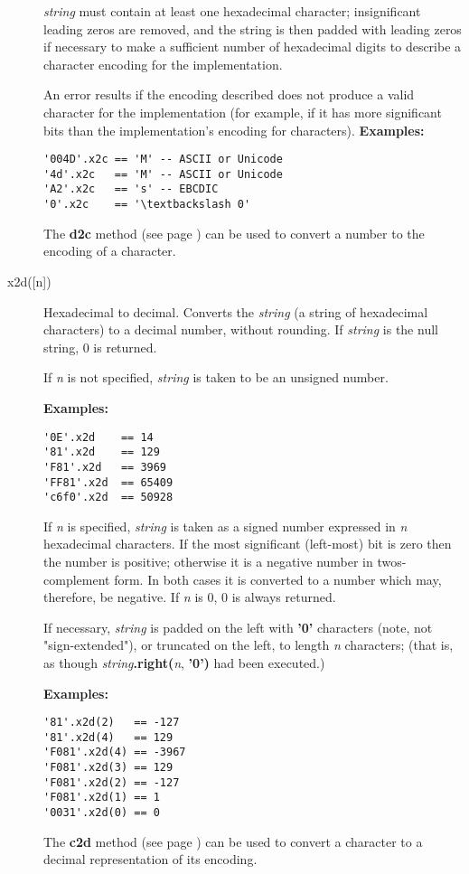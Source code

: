 \begin{description}
\emph{string} must contain at least one hexadecimal character;
insignificant leading zeros are removed, and the string is then padded
with leading zeros if necessary to make a sufficient number of
hexadecimal digits to describe a character encoding for the
implementation.
 
An error results if the encoding described does not produce a valid
character for the implementation (for example, if it has more
significant bits than the implementation's encoding for characters).
 \textbf{Examples:}
\begin{lstlisting}
'004D'.x2c == 'M' -- ASCII or Unicode
'4d'.x2c   == 'M' -- ASCII or Unicode
'A2'.x2c   == 's' -- EBCDIC
'0'.x2c    == '\textbackslash 0'
\end{lstlisting}
 The  \textbf{d2c} method (see page \pageref{refd2c})  can be used to
convert a \nr{} number to the encoding of a character.

\item[x2d([n{]})]\label{refx2d}
Hexadecimal to decimal.
Converts the \emph{string} (a string of hexadecimal characters) to
a decimal number, without rounding.
If \emph{string} is the null string, 0 is returned.
 
If \emph{n} is not specified, \emph{string} is taken to
be an unsigned number.
 
\textbf{Examples:}
\begin{lstlisting}
'0E'.x2d    == 14
'81'.x2d    == 129
'F81'.x2d   == 3969
'FF81'.x2d  == 65409
'c6f0'.x2d  == 50928
\end{lstlisting}
 
If \emph{n} is specified, \emph{string} is taken as a signed
number expressed in \emph{n} hexadecimal characters.
If the most significant (left-most) bit is zero then the number is
positive; otherwise it is a negative number in twos-complement form.
In both cases it is converted to a \nr{} number which may,
therefore, be negative.
If \emph{n} is 0, 0 is always returned.
 
If necessary, \emph{string} is padded on the left
with \textbf{'0'} characters (note, not "sign-extended"), or
truncated on the left, to length \emph{n} characters; (that is, as
though \emph{string}\textbf{.right(}\emph{n}, \textbf{'0')}
had been executed.)
 
\textbf{Examples:}
\begin{lstlisting}
'81'.x2d(2)   == -127
'81'.x2d(4)   == 129
'F081'.x2d(4) == -3967
'F081'.x2d(3) == 129
'F081'.x2d(2) == -127
'F081'.x2d(1) == 1
'0031'.x2d(0) == 0
\end{lstlisting}
 The  \textbf{c2d} method (see page \pageref{refc2d})  can be used to convert
a character to a decimal representation of its encoding.
\end{description}

